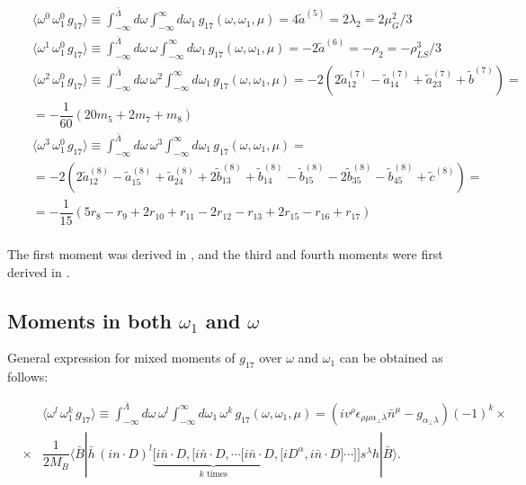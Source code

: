 \begin{eqnarray}
&&\langle\omega^0\,\omega_1^0\,g_{17}\rangle\equiv\int^{\bar \Lambda}_{-\infty}d\omega\int^{\infty}_{-\infty}d\omega_1\,g_{17}(\omega,\omega_1,\mu)=4\tilde{a}^{(5)}=2\lambda_2=2\mu_G^2/3\nonumber\\
&&\langle\omega^1\,\omega_1^0\,g_{17}\rangle\equiv\int^{\bar \Lambda}_{-\infty}d\omega\,\omega\int^{\infty}_{-\infty}d\omega_1 \,g_{17}(\omega,\omega_1,\mu)=-2\tilde{a}^{(6)}=-\rho_2=-\rho^3_{LS}/3\nonumber\\
&&\langle\omega^2\,\omega_1^0\,g_{17}\rangle\equiv\int^{\bar \Lambda}_{-\infty}d\omega\,\omega^2\int^{\infty}_{-\infty}d\omega_1 \,g_{17}(\omega,\omega_1,\mu)=-2 \left(2 \tilde{a}^{(7)}_{12} - \tilde{a}^{(7)}_{14} +  \tilde{a}^{(7)}_{23} + \tilde{b}^{(7)}\right)=\nonumber\\
&&=-\dfrac1{60} \left(20 m_5 +2 m_7 + m_8\right)\nonumber\\
&&\langle\omega^3\,\omega_1^0\,g_{17}\rangle\equiv\int^{\bar \Lambda}_{-\infty}d\omega\,\omega^3\int^{\infty}_{-\infty}d\omega_1 \,g_{17}(\omega,\omega_1,\mu)=\nonumber\\
&&=-2 \left(2 \tilde{a}^{(8)}_{12} - \tilde{a}^{(8)}_{15} +  \tilde{a}^{(8)}_{24} +2 \tilde{b}^{(8)}_{13} + \tilde{b}^{(8)}_{14} - \tilde{b}^{(8)}_{15} - 2\tilde{b}^{(8)}_{35} - \tilde{b}^{(8)}_{45} + \tilde{c}^{(8)}\right)=\nonumber\\
&&=-\dfrac1{15} \left(5r_8 - r_9 +2 r_{10}+r_{11}-2r_{12}-r_{13}+2r_{15}-r_{16}+r_{17}\right)\nonumber\\
\end{eqnarray}  

\vspace{0.2cm}
The first moment was derived in \cite{Benzke:2010js}, and the third and fourth moments were first derived in \cite{Gunawardana:2019gep}.

\subsection{Moments in both $\omega_1$ and $\omega$}

General expression for mixed moments of $g_{17}$ over $\omega$ and $\omega_1$ can be obtained as follows:

\begin{eqnarray}\label{eqn:chap5_Generalww1}
&&\langle\omega^l\,\omega_1^k\,g_{17}\rangle\equiv\int^{\bar \Lambda}_{-\infty}d\omega\,\omega^l \int^{\infty}_{-\infty}d\omega_1\,\omega^k\,g_{17}(\omega,\omega_1,\mu)=\left(iv^\rho\epsilon_{\rho\mu\alpha_\perp\lambda}\bar n^\mu-g_{\alpha_\perp\lambda}\right)(-1)^k\times\nonumber\\
&\times&\dfrac{1}{2M_B}\langle\bar B| \bar h \,(i n\cdot D)^l
    \underbrace{\big[i\bar n\cdot D,\big[i\bar n \cdot D,\cdots[i\bar n \cdot D}_\text{$k$ times},\big[iD^\alpha ,i\bar n \cdot D\big]\cdots\big]\big] s^\lambda h |\bar B\rangle.
\end{eqnarray} 


